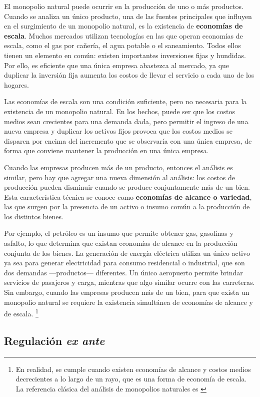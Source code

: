 \documentclass[
  12pt,
  spanish,
]{book}
\begin{document}
El monopolio natural puede ocurrir en la producción de uno o más productos. Cuando se analiza un único producto, una de las fuentes principales que influyen en el surgimiento de un monopolio natural, es la existencia de \textbf{economías de escala}. Muchos mercados utilizan tecnologías en las que operan economías de escala, como el gas por cañería, el agua potable o el saneamiento. Todos ellos tienen un elemento en común: existen importantes inversiones fijas y hundidas. Por ello, es eficiente que una única empresa abastezca al mercado, ya que duplicar la inversión fija aumenta los costos de llevar el servicio a cada uno de los hogares.

Las economías de escala son una condición suficiente, pero no necesaria para la existencia de un monopolio natural. En los hechos, puede ser que los costos medios sean crecientes para una demanda dada, pero permitir el ingreso de una nueva empresa y duplicar los activos fijos provoca que los costos medios se disparen por encima del incremento que se observaría con una única empresa, de forma que conviene mantener la producción en una única empresa.

Cuando las empresas producen más de un producto, entonces el análisis es similar, pero hay que agregar una nueva dimensión al análisis: los costos de producción pueden disminuir cuando se produce conjuntamente más de un bien. Esta característica técnica se conoce como \textbf{economías de alcance o variedad}, las que surgen por la presencia de un activo o insumo común a la producción de los distintos bienes.

Por ejemplo, el petróleo es un insumo que permite obtener gas, gasolinas y asfalto, lo que determina que existan economías de alcance en la producción conjunta de los bienes. La generación de energía eléctrica utiliza un único activo ya sea para generar electricidad para consumo residencial o industrial, que son dos demandas ---productos--- diferentes. Un único aeropuerto permite brindar servicios de pasajeros y carga, mientras que algo similar ocurre con las carreteras. Sin embargo, cuando las empresas producen más de un bien, para que exista un monopolio natural se requiere la existencia simultánea de economías de alcance y de escala.
\footnote{En realidad, se cumple cuando existen economías de alcance y costos medios decrecientes a lo largo de un rayo, que es una forma de economía de escala. La referencia clásica del análisis de monopolios naturales es \citet{Panzar1989}}

\hypertarget{regulaciuxf3n-ex-ante}{%
\subsection{\texorpdfstring{Regulación \emph{ex ante}}{Regulación ex ante}}\label{regulaciuxf3n-ex-ante}}
\end{document}
